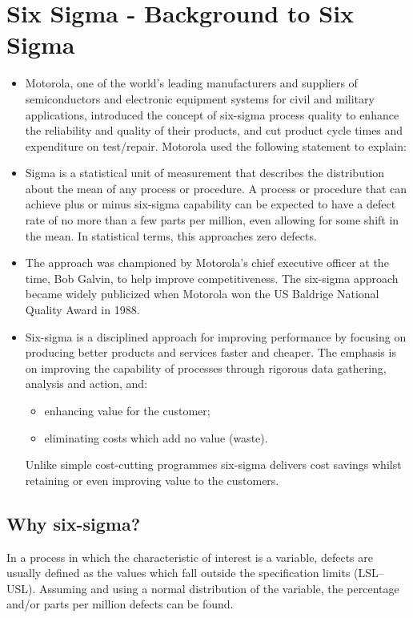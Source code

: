 \documentclass[]{report}
\begin{document}
\section{Six Sigma - Background to Six Sigma}
\begin{itemize}

\item Motorola, one of the world’s leading manufacturers and suppliers of
semiconductors and electronic equipment systems for civil and military
applications, introduced the concept of six-sigma process quality to enhance the reliability and quality of their products, and cut product cycle times and expenditure on test/repair. Motorola used the following statement to explain:

\item Sigma is a statistical unit of measurement that describes the distribution about the mean of any process or procedure. A process or procedure that can achieve plus or minus six-sigma capability can be expected to have a defect rate of no more than a few parts per million, even allowing for some shift in the mean. In statistical terms, this approaches zero defects.

\item The approach was championed by Motorola’s chief executive officer at the
time, Bob Galvin, to help improve competitiveness. The six-sigma approach became widely publicized when Motorola won the US Baldrige National Quality Award in 1988.

\item Six-sigma is a disciplined approach for improving performance by focusing
on producing better products and services faster and cheaper. The emphasis is on improving the capability of processes through rigorous data gathering, analysis and action, and:
\begin{itemize}
	\item 	enhancing value for the customer;
	\item 	eliminating costs which add no value (waste).
\end{itemize}
Unlike simple cost-cutting programmes six-sigma delivers cost savings
whilst retaining or even improving value to the customers.

\end{itemize}
\subsection{	Why six-sigma?}
	In a process in which the characteristic of interest is a variable, defects are usually defined as the values which fall outside the specification limits (LSL–USL). Assuming and using a normal distribution of the variable, the
	percentage and/or parts per million defects can be found. 
	
\end{document}
